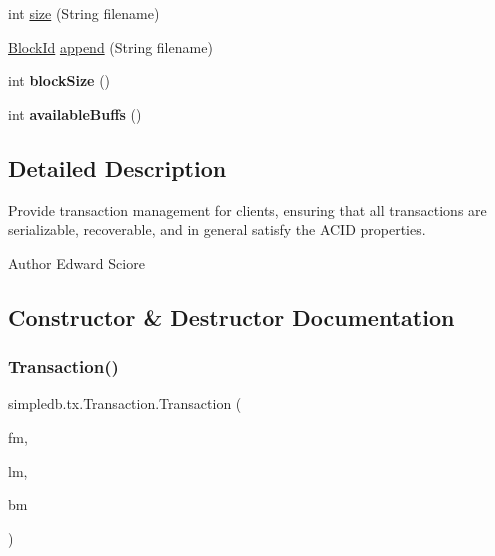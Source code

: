 \begin{DoxyCompactItemize}
\item 
int \hyperlink{classsimpledb_1_1tx_1_1Transaction_a72039ee10cdb989da8dda4f39f304848}{size} (String filename)
\item 
\hyperlink{classsimpledb_1_1file_1_1BlockId}{Block\+Id} \hyperlink{classsimpledb_1_1tx_1_1Transaction_a88d23a92c71f7c637963a2ee5c429ee8}{append} (String filename)
\item 
\mbox{\label{classsimpledb_1_1tx_1_1Transaction_a8440197ad1ea5315b7a6700e800e955c}} 
int {\bfseries block\+Size} ()
\item 
\mbox{\label{classsimpledb_1_1tx_1_1Transaction_a0ef88e6d5031b0b8a1f1c813b9b5e45a}} 
int {\bfseries available\+Buffs} ()
\end{DoxyCompactItemize}


\subsection{Detailed Description}
Provide transaction management for clients, ensuring that all transactions are serializable, recoverable, and in general satisfy the A\+C\+ID properties. \begin{DoxyAuthor}{Author}
Edward Sciore 
\end{DoxyAuthor}


\subsection{Constructor \& Destructor Documentation}
\mbox{\label{classsimpledb_1_1tx_1_1Transaction_a1c2f61c55730c0de8ca616197cf2ec08}} 
\subsubsection{\texorpdfstring{Transaction()}{Transaction()}}
{\footnotesize\ttfamily simpledb.\+tx.\+Transaction.\+Transaction (\begin{DoxyParamCaption}\item[{\hyperlink{classsimpledb_1_1file_1_1FileMgr}{File\+Mgr}}]{fm,  }\item[{\hyperlink{classsimpledb_1_1log_1_1LogMgr}{Log\+Mgr}}]{lm,  }\item[{\hyperlink{classsimpledb_1_1buffer_1_1BufferMgr}{Buffer\+Mgr}}]{bm }\end{DoxyParamCaption})\hspace{0.3cm}{\ttfamily [inline]}}

